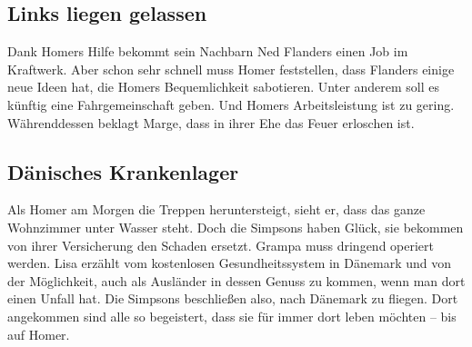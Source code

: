 
\subsection{Links liegen gelassen}\label{XABF12}
Dank Homers Hilfe bekommt sein Nachbarn Ned Flanders einen Job im Kraftwerk. Aber schon sehr schnell muss Homer feststellen, dass Flanders einige neue Ideen hat, die Homers Bequemlichkeit sabotieren. Unter anderem soll es künftig eine Fahrgemeinschaft geben. Und Homers Arbeitsleistung ist zu gering. Währenddessen beklagt Marge, dass in ihrer Ehe das Feuer erloschen ist.


\subsection{Dänisches Krankenlager}\label{XABF13}
Als Homer am Morgen die Treppen heruntersteigt, sieht er, dass das ganze Wohnzimmer unter Wasser steht. Doch die Simpsons haben Glück, sie bekommen von ihrer Versicherung den Schaden ersetzt. Grampa muss dringend operiert werden. Lisa erzählt vom kostenlosen Gesundheitssystem in Dänemark und von der Möglichkeit, auch als Ausländer in dessen Genuss zu kommen, wenn man dort einen Unfall hat. Die Simpsons beschließen also, nach Dänemark zu fliegen. Dort angekommen sind alle so begeistert, dass sie für immer dort leben möchten -- bis auf Homer.

